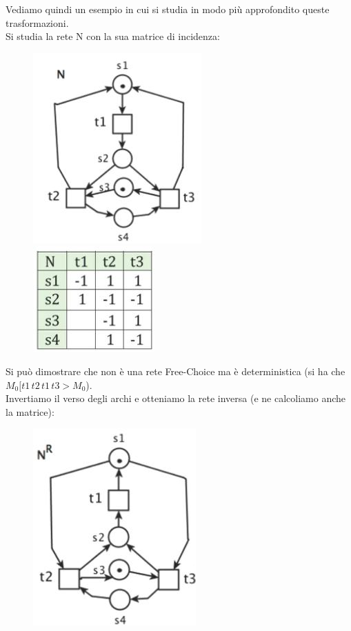 \documentclass[a4paper,12pt, oneside]{book}
\begin{document}
\begin{esempio}
  Vediamo quindi un esempio in cui si studia in modo più approfondito queste
  trasformazioni.\\
  Si studia la rete N con la sua matrice di incidenza:
  \begin{figure}[H]
    \centering
    \includegraphics[scale = 0.5]{img/dr.jpg}
    \includegraphics[scale = 0.6]{img/dr2.jpg}
  \end{figure}
  Si può dimostrare che non è una rete Free-Choice ma è deterministica (si ha
  che $M_0[t1\,t2\,t1\,t3>M_0$).\\
  Invertiamo il verso degli archi e otteniamo la rete inversa (e ne calcoliamo
  anche la matrice):
  \begin{figure}[H]
    \centering
    \includegraphics[scale = 2]{img/dr5.jpg}

\end{figure}
\end{esempio}
\end{document}
